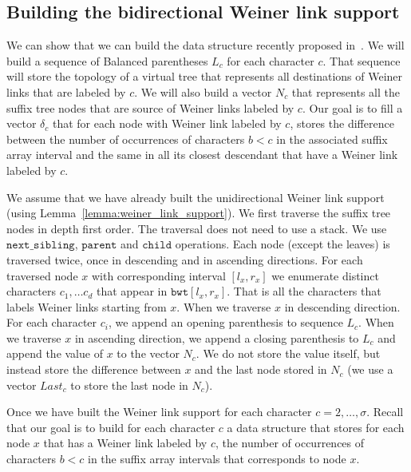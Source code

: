 \documentclass[a4paper]{article}
\begin{document}
\subsection{Building the bidirectional Weiner link support}
\label{sec:build_biweiner_links}

We can show that we can build the data structure recently proposed in~\cite{BCKM13}. 
We will build a sequence of Balanced parentheses $L_c$ for each character 
$c$. That sequence will store the topology of a virtual tree that represents 
all destinations of Weiner links that are labeled by $c$. 
We will also build a vector $N_c$ that represents all the suffix tree 
nodes that are source of Weiner links labeled by $c$. 
Our goal is to fill a vector $\delta_c$ that for each node with Weiner 
link labeled by $c$, stores the difference  between the number of 
occurrences of characters $b<c$ in the associated suffix array interval and the same 
in all its closest descendant that have a Weiner link labeled by $c$. 

We assume that we have already built the unidirectional Weiner link support
(using Lemma~\ref{lemma:weiner_link_support}). 
We first traverse the suffix tree nodes in depth first order. The traversal 
does not need to use a stack. We use $\mathtt{next\_sibling}$, $\mathtt{parent}$ 
and $\mathtt{child}$ operations. Each node (except the leaves) 
is traversed twice, once in descending and in ascending 
directions. 
For each traversed node $x$ with corresponding 
interval $[l_x,r_x]$ we enumerate distinct characters $c_1,\ldots c_d$
that appear in $\mathtt{bwt}[l_x,r_x]$. That is all the characters 
that labels Weiner links starting from $x$. 
When we traverse $x$ in descending direction. For each character $c_i$, we append an 
opening parenthesis to sequence $L_c$. When we traverse $x$ in ascending 
direction, we append a closing parenthesis to $L_c$ and append the value 
of $x$ to the vector $N_c$. We do not store the value itself, but instead 
store the difference between $x$ and the last node stored in $N_c$ (we use 
a vector $Last_c$ to store the last node in $N_c$). 

Once we have built the Weiner link support for each character $c=2,\ldots ,\sigma$. 
Recall that our goal is to build for each character $c$ a data structure that stores 
for each node $x$ that has a Weiner link labeled by $c$, the number 
of occurrences of characters $b<c$ in the suffix array intervals that corresponds to node $x$. 
\end{document}
